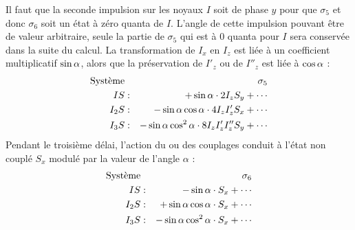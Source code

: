 Il faut que la seconde impulsion sur les noyaux $I$ soit de phase $y$ pour
que $\sigma_5$ et donc $\sigma_6$ soit un état à zéro quanta de $I$.
L'angle de cette impulsion pouvant être de valeur arbitraire, seule la partie de $\sigma_5$
qui est à 0 quanta pour $I$ sera conservée dans la suite du calcul.
La transformation de $I_x$ en $I_z$ est liée à un coefficient multiplicatif $\sin\alpha$,
alors que la préservation de $I'_z$ ou de $I''_z$ est liée à $\cos\alpha$ : 
\begin{eqnarray}
\mbox{Système} & & \sigma_5 \nonumber\\
IS & : & + \sin\alpha \cdot 2I_zS_y + \cdots \\
I_2S & : & - \sin\alpha\cos\alpha \cdot 4I_zI'_zS_x + \cdots \\
I_3S & : & - \sin\alpha\cos^2\alpha \cdot 8I_zI'_zI''_zS_y + \cdots
\end{eqnarray}
Pendant le troisième délai, l'action du ou des couplages conduit à l'état non
couplé $S_x$ modulé par la valeur de l'angle $\alpha$ :
\begin{eqnarray}
\mbox{Système} & & \sigma_6 \nonumber\\
IS & : & - \sin\alpha \cdot S_x + \cdots \\
I_2S & : & + \sin\alpha\cos\alpha \cdot S_x + \cdots \\
I_3S & : & - \sin\alpha\cos^2\alpha \cdot S_x + \cdots
\end{eqnarray}

